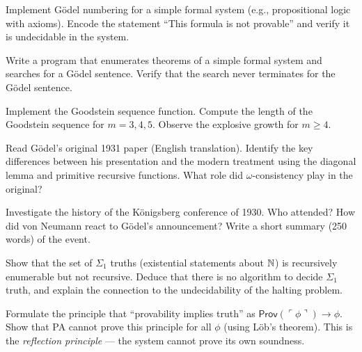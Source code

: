 \begin{exercise}[Computational]
Implement Gödel numbering for a simple formal system (e.g., propositional logic with axioms). Encode the statement ``This formula is not provable'' and verify it is undecidable in the system.
\end{exercise}

\begin{exercise}[Computational]
Write a program that enumerates theorems of a simple formal system and searches for a Gödel sentence. Verify that the search never terminates for the Gödel sentence.
\end{exercise}

\begin{exercise}[Computational]
Implement the Goodstein sequence function. Compute the length of the Goodstein sequence for $m = 3, 4, 5$. Observe the explosive growth for $m \ge 4$.
\end{exercise}

\begin{exercise}[Research]
Read Gödel's original 1931 paper (English translation). Identify the key differences between his presentation and the modern treatment using the diagonal lemma and primitive recursive functions. What role did $\omega$-consistency play in the original?
\end{exercise}

\begin{exercise}[Research]
Investigate the history of the Königsberg conference of 1930. Who attended? How did von Neumann react to Gödel's announcement? Write a short summary (250 words) of the event.
\end{exercise}

\begin{exercise}[Challenge]
Show that the set of $\Sigma_1$ truths (existential statements about $\mathbb{N}$) is recursively enumerable but not recursive. Deduce that there is no algorithm to decide $\Sigma_1$ truth, and explain the connection to the undecidability of the halting problem.
\end{exercise}

\begin{exercise}[Challenge]
Formulate the principle that ``provability implies truth'' as $\mathsf{Prov}(\ulcorner \phi \urcorner) \to \phi$. Show that PA cannot prove this principle for all $\phi$ (using Löb's theorem). This is the \emph{reflection principle} --- the system cannot prove its own soundness.
\end{exercise}


